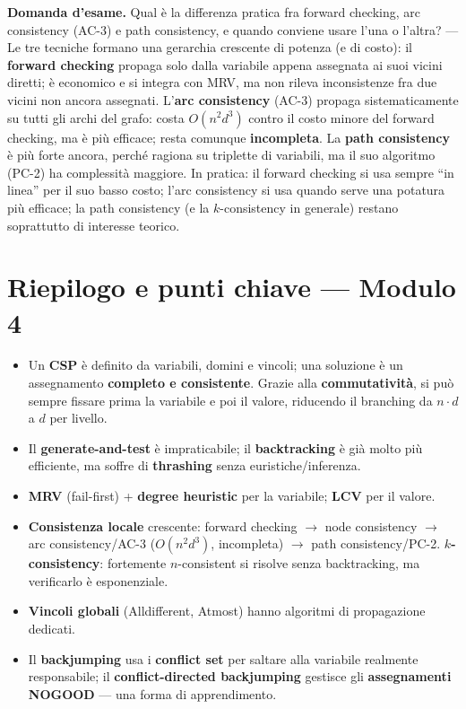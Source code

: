 \documentclass[11pt,a4paper]{report}
\newcommand{\domandaesame}[1]{\begin{esame}\textbf{Domanda d'esame.} #1\end{esame}}
\begin{document}
\domandaesame{Qual è la differenza pratica fra forward checking, arc consistency (AC-3) e path consistency, e quando conviene usare l'una o l'altra? --- Le tre tecniche formano una gerarchia crescente di potenza (e di costo): il \textbf{forward checking} propaga solo dalla variabile appena assegnata ai suoi vicini diretti; è economico e si integra con MRV, ma non rileva inconsistenze fra due vicini non ancora assegnati. L'\textbf{arc consistency} (AC-3) propaga sistematicamente su tutti gli archi del grafo: costa $O(n^2d^3)$ contro il costo minore del forward checking, ma è più efficace; resta comunque \textbf{incompleta}. La \textbf{path consistency} è più forte ancora, perché ragiona su triplette di variabili, ma il suo algoritmo (PC-2) ha complessità maggiore. In pratica: il forward checking si usa sempre ``in linea'' per il suo basso costo; l'arc consistency si usa quando serve una potatura più efficace; la path consistency (e la $k$-consistency in generale) restano soprattutto di interesse teorico.}

\section*{Riepilogo e punti chiave --- Modulo 4}

\begin{itemize}
  \item Un \textbf{CSP} è definito da variabili, domini e vincoli; una soluzione è un assegnamento \textbf{completo e consistente}. Grazie alla \textbf{commutatività}, si può sempre fissare prima la variabile e poi il valore, riducendo il branching da $n\cdot d$ a $d$ per livello.
  \item Il \textbf{generate-and-test} è impraticabile; il \textbf{backtracking} è già molto più efficiente, ma soffre di \textbf{thrashing} senza euristiche/inferenza.
  \item \textbf{MRV} (fail-first) + \textbf{degree heuristic} per la variabile; \textbf{LCV} per il valore.
  \item \textbf{Consistenza locale} crescente: forward checking $\to$ node consistency $\to$ arc consistency/AC-3 ($O(n^2d^3)$, incompleta) $\to$ path consistency/PC-2. \textbf{$k$-consistency}: fortemente $n$-consistent si risolve senza backtracking, ma verificarlo è esponenziale.
  \item \textbf{Vincoli globali} (Alldifferent, Atmost) hanno algoritmi di propagazione dedicati.
  \item Il \textbf{backjumping} usa i \textbf{conflict set} per saltare alla variabile realmente responsabile; il \textbf{conflict-directed backjumping} gestisce gli \textbf{assegnamenti NOGOOD} --- una forma di apprendimento.
\end{itemize}
\end{document}
